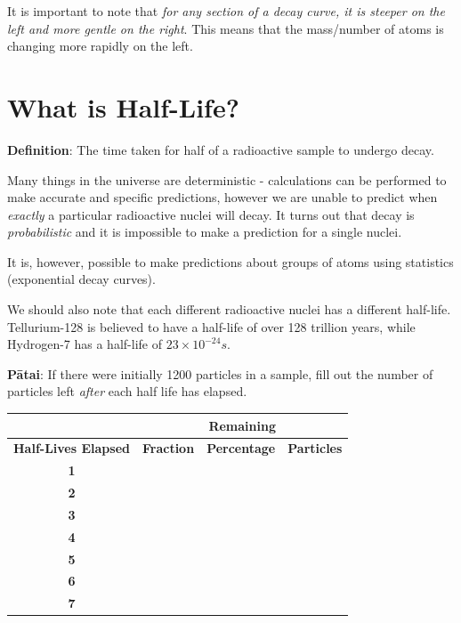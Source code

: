 \documentclass[12pt]{report}
\begin{document}
{It is important to note that \textit{for any section of a decay curve, it is steeper on the left and more gentle on the right}. This means that the mass/number of atoms is changing more rapidly on the left.

\section{What is Half-Life?}

\noindent\textbf{Definition}: The time taken for half of a radioactive sample to undergo decay.

Many things in the universe are deterministic - calculations can be performed to make accurate and specific predictions, however we are unable to predict when \textit{exactly} a particular radioactive nuclei will decay. It turns out that decay is \textit{probabilistic} and it is impossible to make a prediction for a single nuclei.

It is, however, possible to make predictions about groups of atoms using statistics (exponential decay curves).

We should also note that each different radioactive nuclei has a different half-life. Tellurium-128 is believed to have a half-life of over 128 trillion years, while Hydrogen-7 has a half-life of $23\times10^{-24}s$.


\noindent\textbf{Pātai}: If there were initially 1200 particles in a sample, fill out the number of particles left \textit{after} each half life has elapsed.

\begin{table}[h]
\centering
\begin{tabular}{c|c|c|c|}
\cline{2-4}
\textbf{}                                         & \multicolumn{3}{c|}{\textbf{Remaining}}                      \\ \hline
\multicolumn{1}{|c|}{\textbf{Half-Lives Elapsed}} & \textbf{Fraction} & \textbf{Percentage} & \textbf{Particles} \\ \hline
\multicolumn{1}{|c|}{\textbf{1}}                  &                &                   &                    \\ \hline
\multicolumn{1}{|c|}{\textbf{2}}                  &                &                   &                    \\ \hline
\multicolumn{1}{|c|}{\textbf{3}}                  &                &                 &                    \\ \hline
\multicolumn{1}{|c|}{\textbf{4}}                  &               &                 &                    \\ \hline
\multicolumn{1}{|c|}{\textbf{5}}                  &               &                &                    \\ \hline
\multicolumn{1}{|c|}{\textbf{6}}                  &               &               &                    \\ \hline
\multicolumn{1}{|c|}{\textbf{7}}                  &              &              &                    \\ \hline
\end{tabular}
\end{table}

}
\end{document}
